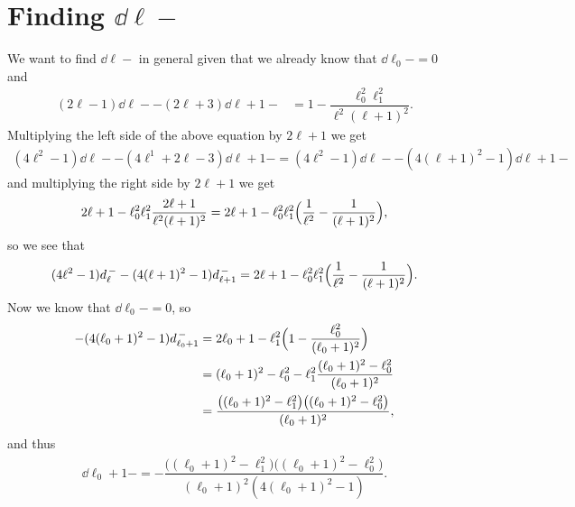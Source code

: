 \section{\texorpdfstring{Finding $\dd{\ell}{-}$}{Finding d\_l\^-}}\label{sec:dl-calc}

We want to find $\dd{\ell}{-}$ in general given that we already know that $\dd{\ell_0}{-}=0$ and
\begin{align*}
  (2\ell-1)\dd{\ell}{-} - (2\ell+3)\dd{\ell+1}{-} &= 1 - \dfrac{\ell_0^2\ell_1^2}{\ell^2(\ell+1)^2}.
\end{align*}
Multiplying the left side of the above equation by $2\ell+1$ we get
\begin{align*}
  (4\ell^2-1)\dd{\ell}{-} - (4\ell^1+2\ell-3)\dd{\ell+1}{-} = (4\ell^2-1)\dd{\ell}{-} - (4(\ell+1)^2-1)\dd{\ell+1}{-}
\end{align*}
and multiplying the right side by $2\ell+1$ we get
\begin{align*}
  2\ell+1 - \ell_0^2\ell_1^2\dfrac{2\ell+1}{\ell^2(\ell+1)^2} = 2\ell+1 - \ell_0^2\ell_1^2\Bigl( \dfrac{1}{\ell^2} - \dfrac{1}{(\ell+1)^2} \Bigr),
\end{align*}
so we see that
\begin{align}\label{eq:dl-calc}
  (4\ell^2-1)d_{\ell}^{\,-} - (4(\ell+1)^2-1)d_{\ell+1}^{\,-} =  2\ell+1 - \ell_0^2\ell_1^2\Bigl( \dfrac{1}{\ell^2} - \dfrac{1}{(\ell+1)^2} \Bigr).
\end{align}
Now we know that $\dd{\ell_0}{-}=0$, so
\begin{align*}
  - (4(\ell_0+1)^2-1)d_{\ell_0+1}^{\,-} &=  2\ell_0+1 - \ell_1^2\Bigl( 1 - \dfrac{\ell_0^2}{(\ell_0+1)^2} \Bigr) \\
                                      &= (\ell_0+1)^2-\ell_0^2 - \ell_1^2\dfrac{(\ell_0+1)^2-\ell_0^2}{(\ell_0+1)^2} \\
                                      &= \dfrac{\bigl((\ell_0+1)^2 - \ell_1^2\bigr)\bigl( (\ell_0+1)^2 - \ell_0^2 \bigr)}{(\ell_0+1)^2},
\end{align*}
and thus
\begin{align*}
  \dd{\ell_0+1}{-} = -\dfrac{\bigl((\ell_0+1)^2 - \ell_1^2\bigr)\bigl( (\ell_0+1)^2 - \ell_0^2 \bigr)}{(\ell_0+1)^2(4(\ell_0+1)^2-1)}.
\end{align*}

